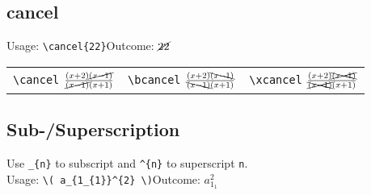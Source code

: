\documentclass[draft]{../cheatsht/cheatsht}
\begin{document}
\subsection{cancel}
Usage: \verb!\cancel{22}!\hspace{1.5cm}Outcome: \(\cancel{22}\)\vspace{4pt}\\
\begin{tabular}{@{}lll@{}}
  \verb!\cancel!  \(\frac{(x+2)\cancel{(x-1)}}{\cancel{(x-1)}(x+1)}\) &
  \verb!\bcancel! \(\frac{(x+2)\bcancel{(x-1)}}{\bcancel{(x-1)}(x+1)}\) &
  \verb!\xcancel! \(\frac{(x+2)\xcancel{(x-1)}}{\xcancel{(x-1)}(x+1)}\)
\end{tabular}

\subsection{Sub-/Superscription}
Use \verb!_{n}! to subscript and \verb!^{n}! to superscript \verb!n!.\\
Usage: \verb!\( a_{1_{1}}^{2} \)!\hspace{1.5cm}Outcome: \( a_{1_{1}}^{2}\)
\end{document}
